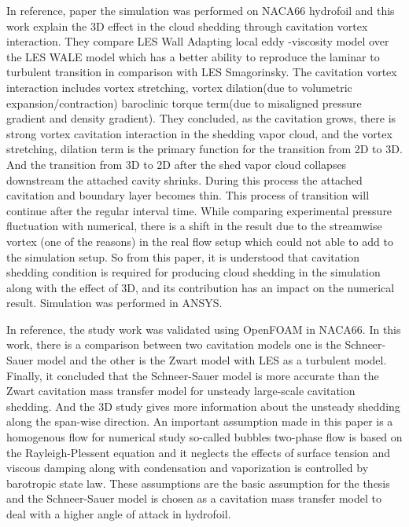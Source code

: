 In reference,  paper \cite{JI2015, JI2017} the simulation was performed on
NACA66 hydrofoil and this work explain the 3D effect in the cloud
shedding through cavitation vortex
interaction. They compare LES Wall Adapting local eddy -viscosity
model over the LES WALE model which has a better ability to reproduce the laminar to
turbulent transition in comparison with LES Smagorinsky. The cavitation
vortex interaction includes vortex stretching, vortex dilation(due
to volumetric expansion/contraction) baroclinic torque term(due to
misaligned pressure gradient and density gradient). They concluded,
as the cavitation grows, there is strong vortex cavitation interaction
in the shedding vapor cloud, and the vortex stretching, dilation term is
the primary function for the transition from 2D to 3D. And the transition
from 3D to 2D after the shed vapor cloud collapses downstream the attached cavity shrinks. During this process the attached cavitation and boundary layer becomes
thin. This process of transition will continue after the regular interval time. While comparing experimental pressure fluctuation with numerical, there is a shift in the result 
 due to the streamwise vortex (one of the reasons) in the real flow setup
which could not able to add to the simulation setup. So from this
paper, it is understood that cavitation shedding condition is required for producing cloud
shedding in the simulation along with the effect of 3D, and its
contribution has an impact on the numerical result. Simulation was performed in ANSYS.  

In reference, \cite{Hidalgo2014,Hai2020,Hidalgo2014-2} the study work was validated
using OpenFOAM in NACA66. In this work, there is a comparison between
two cavitation models one is the Schneer-Sauer model and the other is
the Zwart model with LES as a turbulent model. Finally, it concluded
that the Schneer-Sauer model is more accurate than the Zwart
cavitation mass transfer model for unsteady large-scale cavitation
shedding. And the 3D study gives more information about the unsteady
shedding along the span-wise direction. An important assumption made in this paper is a
homogenous flow for numerical study so-called bubbles two-phase
flow is based on the Rayleigh-Plessent equation and it neglects the
effects of surface tension and viscous damping along with condensation
and vaporization is controlled by barotropic state law. These
assumptions  are the basic assumption for the thesis
and the Schneer-Sauer model is chosen as a cavitation mass transfer
model to deal with a higher angle of attack in hydrofoil.  
  

